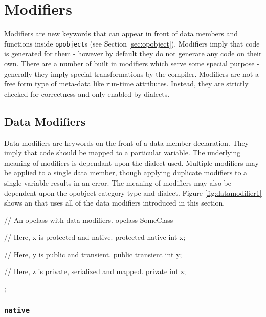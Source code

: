 
\chapter{Modifiers}
\label{chap:modifiers}

Modifiers are new keywords that can appear in front of data members and functions inside {\tt opobject}s (see Section \ref{sec:opobject}).  Modifiers imply that code is generated for them - however by default they do not generate any code on their own.  There are a number of built in modifiers which serve some special purpose - generally they imply special transformations by the compiler.  Modifiers are not a free form type of meta-data like run-time attributes.  Instead, they are strictly checked for correctness and only enabled by dialects.

\section{Data Modifiers}

Data modifiers are keywords on the front of a data member declaration.  They imply that code should be mapped to a particular variable.  The underlying meaning of modifiers is dependant upon the dialect used.  Multiple modifiers may be applied to a single data member, though applying duplicate modifiers to a single variable results in an error.  The meaning of modifiers may also be dependent upon the opobject category type and dialect.  Figure \ref{fig:datamodifier1} shows an  that uses all of the data modifiers introduced in this section.

\begin{opcpp}[label={fig:datamodifier1},caption={An \opcppK{opclass} that uses all the data modifiers introduced in this section.}]
// An opclass with data modifiers.
opclass SomeClass
{
	// Here, x is protected and native.
	protected native int x;

	// Here, y is public and transient.
	public transient int y;

	// Here, z is private, serialized and mapped.
	private int z;
};
\end{opcpp}

\subsection{{\tt native}}

